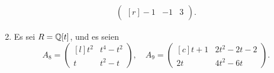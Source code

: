 \begin{question}[subtitle = Smith-Normalform Und Kokerne]
\begin{enumerate}
\begin{gather*}
\begin{pmatrix*}[r]
           -1 & -1  & 3
        \end{pmatrix*}.
      \end{gather*}
    \item
      Es sei $R = \mathbb{Q}[t]$, und es seien
      \[
        A_8 =
        \begin{pmatrix*}[l]
          t^2 & t^4 - t^2 \\
          t   & t^2 - t
        \end{pmatrix*},
        \quad
        A_9 =
        \begin{pmatrix*}[c]
            t + 1 & 2 t^2 - 2 t - 2 \\
          2 t     & 4 t^2 - 6 t
        \end{pmatrix*}.
      \]
  \end{enumerate}
\end{question}


